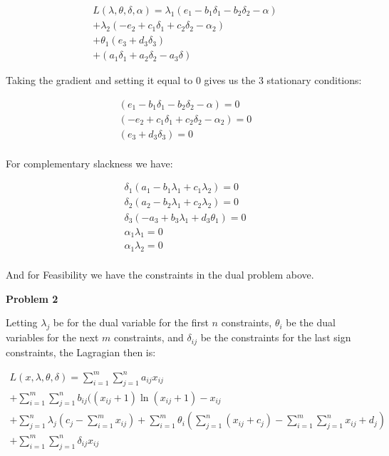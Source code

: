\documentclass{article}
\begin{document}
\begin{gather*}
  L(\lambda, \theta, \delta, \alpha) = \lambda_1(e_1 - b_1 \delta_1 - b_2\delta_2 - \alpha)\\
 + \lambda_2(-e_2 + c_1\delta_1 + c_2\delta_2 - \alpha_2)\\
 + \theta_1(e_3 + d_3\delta_3)\\
 + (a_1\delta_1 + a_2\delta_2 - a_3\delta) 
\end{gather*}

\newpage

Taking the gradient and setting it equal to 0 gives us the 3 stationary conditions:

\begin{gather*}
  (e_1 - b_1 \delta_1 - b_2\delta_2 - \alpha) = 0\\
  (-e_2 + c_1\delta_1 + c_2\delta_2 - \alpha_2) = 0\\
  (e_3 + d_3\delta_3) = 0\\
\end{gather*}

For complementary slackness we have:


\begin{gather*}
  \delta_1 (a_1 - b_1\lambda_1 + c_1\lambda_2) = 0\\
  \delta_2 (a_2 - b_2\lambda_1 + c_2\lambda_2) = 0\\
  \delta_3 (-a_3 + b_3\lambda_1 + d_3\theta_1) = 0\\
  \alpha_1 \lambda_1 = 0\\
  \alpha_1 \lambda_2 = 0\\
\end{gather*}  

And for Feasibility we have the constraints in the dual problem above. 

\vspace{5mm}

\noindent\textbf{Problem 2}

Letting $\lambda_j$ be for the dual variable for the first $n$ constraints, $\theta_i$ be the dual variables for the next $m$ constraints, and $\delta_{ij}$ be the constraints for the last sign constraints, the Lagragian then is:

\begin{gather*}
  L(x,\lambda,\theta,\delta) = \sum_{i=1}^m \sum_{j=1}^n a_{ij}x_{ij} \\
  + \sum_{i=1}^m\sum_{j=1}^n b_{ij}((x_{ij} + 1)\ln(x_{ij} + 1) - x_{ij} \\
  + \sum_{j=1}^n \lambda_j (c_j - \sum_{i=1}^m x_{ij}) + \sum_{i=1}^m \theta_i (\sum_{j=1}^n (x_{ij} + c_j) - \sum_{i=1}^m \sum_{j=1}^n x_{ij} + d_j)\\
  + \sum_{i=1}^m\sum_{j=1}^n \delta_{ij}x_{ij} \\
\end{gather*}
\end{document}
